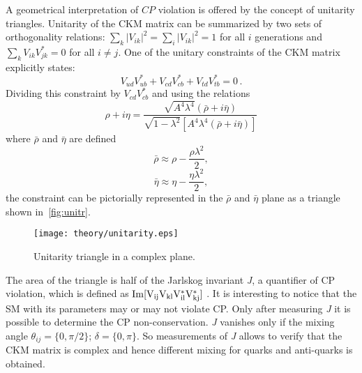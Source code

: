 A geometrical interpretation of $CP$ violation is offered by the concept of unitarity triangles. Unitarity of the \gls{CKM} matrix can be summarized by two sets of orthogonality relations:
$\sum_{k} |V_{ik}|^2 = \sum_{i} |V_{ik}|^2 = 1$ for all $i$ generations and $\sum_k V_{ik}V^*_{jk} = 0$ for all $i\neq j$. One of the unitary constraints of the \gls{CKM} matrix explicitly states:
\begin{equation}
  V_{ud}V^*_{ub} + V_{cd}V^*_{cb} + V_{td}V^*_{tb} = 0 \, .
\end{equation}
Dividing this constraint by $V_{cd}V^*_{cb}$ and using the relations 
\begin{equation}
   {\rho} + i {\eta} = \frac{\sqrt{A^{4}\lambda^{4}}(\bar{\rho} + i \bar{\eta})}{\sqrt{1-\lambda^2}[A^{4}\lambda^{4}(\bar{\rho} + i \bar{\eta})]}
\end{equation}
 where $\bar{\rho}$ and $\bar{\eta}$ are defined
\begin{equation}
\bar{\rho} \approx \rho - \frac{\rho\lambda^{2}}{2},
\end{equation}
\begin{equation}
\bar{\eta} \approx \eta - \frac{\eta\lambda^{2}}{2},
\end{equation}
the constraint can be pictorially represented in the $\bar{\rho}$ and $\bar{\eta}$ plane as a triangle shown in~\autoref{fig:unitr}.
\begin{figure}[h]
\centering
\texttt{[image: theory/unitarity.eps]}
\caption{Unitarity triangle in a complex plane.}
\label{fig:unitr}
\end{figure}
The area of the triangle is half of the Jarlskog invariant \textit{J}, a quantifier of CP violation, which is defined as $\rm{Im}[V_{ij}V_{kl}V^*_{il}V^*_{kj}]$ \cite{Jarlskog:1985ht}. It is interesting to notice that the \gls{SM} with its parameters may or may not violate CP. Only after measuring \textit{J} it is possible to determine the CP non-conservation. \textit{J} vanishes only if the mixing angle $\theta_{ij} = \{0 , \pi/2\}$; $\delta = \{0 , \pi\}$. So measurements of \textit{J} allows to verify that the \gls{CKM} matrix is complex and hence different mixing for quarks and anti-quarks is obtained.%

